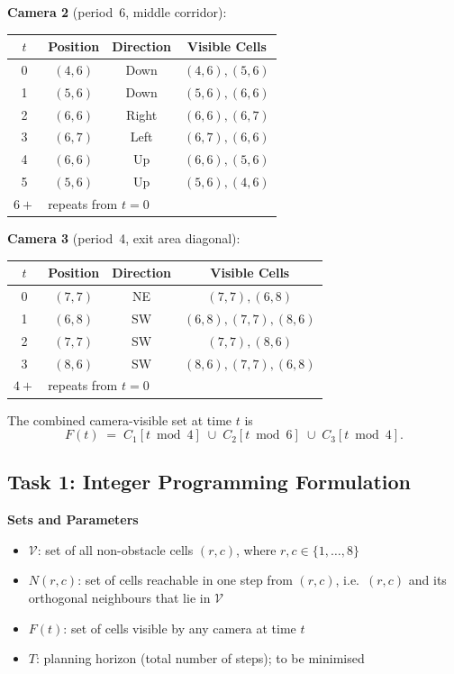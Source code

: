 \documentclass[12pt,a4paper]{article}
\begin{document}
\textbf{Camera 2} (period~6, middle corridor):

\begin{center}
\begin{tabular}{cccc}
\toprule
$t$ & Position & Direction & Visible Cells \\
\midrule
0 & $(4,6)$ & Down  & $(4,6),(5,6)$ \\
1 & $(5,6)$ & Down  & $(5,6),(6,6)$ \\
2 & $(6,6)$ & Right & $(6,6),(6,7)$ \\
3 & $(6,7)$ & Left  & $(6,7),(6,6)$ \\
4 & $(6,6)$ & Up    & $(6,6),(5,6)$ \\
5 & $(5,6)$ & Up    & $(5,6),(4,6)$ \\
$6+$ & \multicolumn{3}{l}{repeats from $t=0$} \\
\bottomrule
\end{tabular}
\end{center}

\textbf{Camera 3} (period~4, exit area diagonal):

\begin{center}
\begin{tabular}{cccc}
\toprule
$t$ & Position & Direction & Visible Cells \\
\midrule
0 & $(7,7)$ & NE & $(7,7),(6,8)$ \\
1 & $(6,8)$ & SW & $(6,8),(7,7),(8,6)$ \\
2 & $(7,7)$ & SW & $(7,7),(8,6)$ \\
3 & $(8,6)$ & SW & $(8,6),(7,7),(6,8)$ \\
$4+$ & \multicolumn{3}{l}{repeats from $t=0$} \\
\bottomrule
\end{tabular}
\end{center}

The combined camera-visible set at time $t$ is
\[
  F(t) \;=\; C_1[t \bmod 4]\;\cup\; C_2[t \bmod 6]\;\cup\; C_3[t \bmod 4].
\]

\subsection*{Task 1: Integer Programming Formulation}

\textbf{Sets and Parameters}

\begin{itemize}
  \item $\mathcal{V}$: set of all non-obstacle cells $(r,c)$, where $r,c\in\{1,\ldots,8\}$
  \item $N(r,c)$: set of cells reachable in one step from $(r,c)$, i.e.\ $(r,c)$ and its orthogonal
        neighbours that lie in $\mathcal{V}$
  \item $F(t)$: set of cells visible by any camera at time $t$
  \item $T$: planning horizon (total number of steps); to be minimised
\end{itemize}
\end{document}
